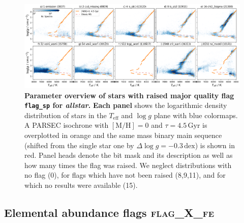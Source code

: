 \documentclass[
  journal=pasa,
  manuscript=research-paper, %
  year=2024,
  volume=37
]{cup-journal}
\newcommand{\Teff}{$T_\mathrm{eff}$\xspace}
\newcommand{\logg}{$\log g$\xspace}
\begin{document}
\begin{figure}[ht]
 \centering
 \includegraphics[width=\textwidth]{figures/flag_sp_overview_allstar.png}
 \caption{\textbf{Parameter overview of stars with raised major quality flag \texttt{flag\_sp} for \textit{allstar}.}
 \textbf{Each panel} shows the logarithmic density distribution of stars in the \Teff and \logg plane with blue colormaps. A PARSEC isochrone with $\mathrm{[M/H]}=0$ and $\tau = 4.5\,\mathrm{Gyr}$ is overplotted in orange and the same mass binary main sequence (shifted from the single star one by $\Delta \log g = -0.3\,\mathrm{dex}$) is shown in red. Panel heads denote the bit mask and its description as well as how many times the flag was raised. We neglect distributions with no flag (0), for flags which have not been raised (8,9,11), and for which no results were available (15).} \label{fig:flag_sp_overview_allstar}
\end{figure}


\subsection{Elemental abundance flags \textsc{flag\_X\_fe}}
\label{sec:flag_x_fe}
\end{document}
